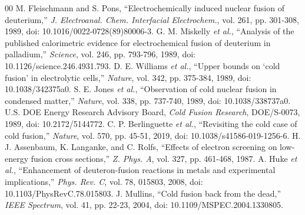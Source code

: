 \documentclass[conference]{IEEEtran}
\begin{document}
\begin{thebibliography}{00}
 M. Fleischmann and S. Pons, ``Electrochemically induced nuclear fusion of deuterium,'' \emph{J. Electroanal. Chem. Interfacial Electrochem.}, vol. 261, pp. 301-308, 1989, doi: 10.1016/0022-0728(89)80006-3.
 G. M. Miskelly \emph{et al.}, ``Analysis of the published calorimetric evidence for electrochemical fusion of deuterium in palladium,'' \emph{Science}, vol. 246, pp. 793-796, 1989, doi: 10.1126/science.246.4931.793.
 D. E. Williams \emph{et al.}, ``Upper bounds on `cold fusion' in electrolytic cells,'' \emph{Nature}, vol. 342, pp. 375-384, 1989, doi: 10.1038/342375a0.
 S. E. Jones \emph{et al.}, ``Observation of cold nuclear fusion in condensed matter,'' \emph{Nature}, vol. 338, pp. 737-740, 1989, doi: 10.1038/338737a0.
 U.S. DOE Energy Research Advisory Board, \emph{Cold Fusion Research}, DOE/S-0073, 1989, doi: 10.2172/5144772.
 C. P. Berlinguette \emph{et al.}, ``Revisiting the cold case of cold fusion,'' \emph{Nature}, vol. 570, pp. 45-51, 2019, doi: 10.1038/s41586-019-1256-6.
 H. J. Assenbaum, K. Langanke, and C. Rolfs, ``Effects of electron screening on low-energy fusion cross sections,'' \emph{Z. Phys. A}, vol. 327, pp. 461-468, 1987.
 A. Huke \emph{et al.}, ``Enhancement of deuteron-fusion reactions in metals and experimental implications,'' \emph{Phys. Rev. C}, vol. 78, 015803, 2008, doi: 10.1103/PhysRevC.78.015803.
 J. Mullins, ``Cold fusion back from the dead,'' \emph{IEEE Spectrum}, vol. 41, pp. 22-23, 2004, doi: 10.1109/MSPEC.2004.1330805.
\end{thebibliography}
\end{document}
